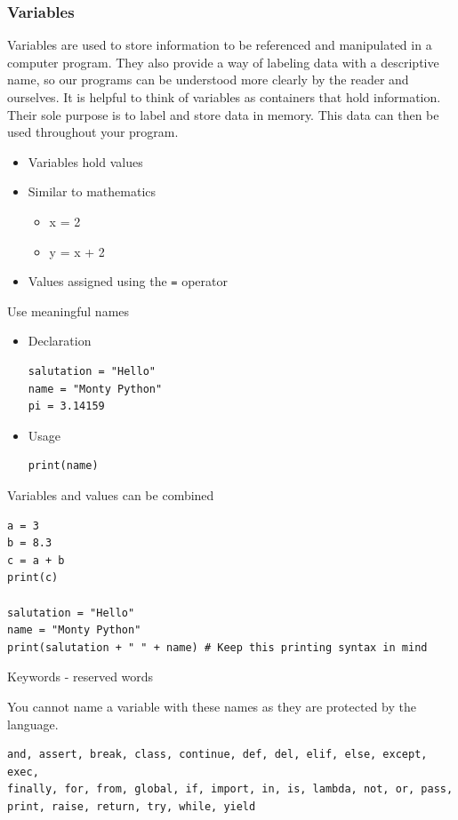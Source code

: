 \documentclass[10pt, a4paper]{beamer} %
\begin{document}
\begin{frame}\frametitle{Variables}

  Variables are used to store information to be referenced and manipulated in a computer program.
  They also provide a way of labeling data with a descriptive name, so our programs can be understood more clearly by the reader and ourselves.
  It is helpful to think of variables as containers that hold information.
  Their sole purpose is to label and store data in memory.
  This data can then be used throughout your program.

  \begin{itemize}
    \item Variables hold values
    \item Similar to mathematics
          \begin{itemize}
            \item x = 2
            \item y = x + 2
          \end{itemize}
    \item Values assigned using the \texttt{=} operator
  \end{itemize}
  \begin{examples}
    Use meaningful names
    \begin{itemize}
      \item Declaration
            \begin{lstlisting}
salutation = "Hello"
name = "Monty Python"
pi = 3.14159
    \end{lstlisting}
      \item Usage
            \begin{lstlisting}
print(name)
    \end{lstlisting}
    \end{itemize}

  \end{examples}
  \framebreak
  \begin{block}{Variables and values can be combined}
    \begin{lstlisting}
a = 3
b = 8.3
c = a + b
print(c)

salutation = "Hello"
name = "Monty Python"
print(salutation + " " + name) # Keep this printing syntax in mind
    \end{lstlisting}
  \end{block}
  \framebreak
  \begin{block}{Keywords - reserved words}

    You cannot name a variable with these names as they are protected by the language.

    \begin{lstlisting}
and, assert, break, class, continue, def, del, elif, else, except, exec,
finally, for, from, global, if, import, in, is, lambda, not, or, pass,
print, raise, return, try, while, yield
\end{lstlisting}

  \end{block}
\end{frame}
\end{document}
